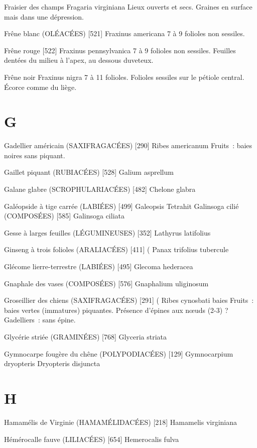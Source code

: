 Fraisier des champs
				Fragaria virginiana
Lieux ouverts et secs. Graines en surface mais dans une dépression.

Frêne blanc (OLÉACÉES)  [521]
				Fraxinus americana
7 à 9 folioles non sessiles.



Frêne rouge  [522]
				Fraxinus pennsylvanica
7 à 9 folioles non sessiles. Feuilles dentées du milieu à l’apex, au dessous duveteux.

Frêne noir
				Fraxinus nigra
7 à 11 folioles. Folioles sessiles sur le pétiole central.
Écorce comme du liège.

\chapter*{G}

Gadellier américain (SAXIFRAGACÉES)  [290]
				Ribes americanum
Fruits : baies noires sans piquant.

Gaillet piquant (RUBIACÉES)  [528]
				Galium asprellum

Galane glabre (SCROPHULARIACÉES)  [482]
				Chelone glabra

Galéopside à tige carrée (LABIÉES)  [499]
				Galeopsis Tetrahit
Galinsoga cilié (COMPOSÉES)  [585]
				Galinsoga ciliata

Gesse à larges feuilles (LÉGUMINEUSES)  [352]
				Lathyrus latifolius

Ginseng à trois folioles (ARALIACÉES)  [411]		(
				Panax trifolius				tubercule

Glécome lierre-terrestre (LABIÉES)  [495]
				Glecoma hederacea

Gnaphale des vases (COMPOSÉES)  [576]
				Gnaphalium uliginosum

Groseillier des chiens (SAXIFRAGACÉES)  [291]			(
				Ribes cynosbati					baies
Fruits : baies vertes (immatures) piquantes.
Présence d’épines aux nœuds (2-3) ? Gadelliers : sans épine.

Glycérie striée (GRAMINÉES)  [768]
				Glyceria striata


Gymnocarpe fougère du chêne (POLYPODIACÉES) [129]
				Gymnocarpium dryopteris
				Dryopteris disjuncta

\chapter*{H}

Hamamélis de Virginie (HAMAMÉLIDACÉES)  [218]
				Hamamelis virginiana

Hémérocalle fauve (LILIACÉES)  [654]
				Hemerocalis fulva

